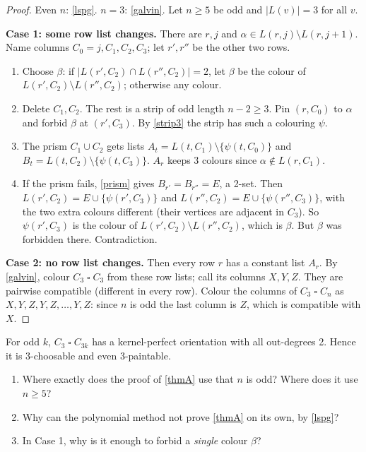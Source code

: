 \documentclass[11pt,oneside,openany]{book}
\newcounter{res}[chapter]
\renewcommand{\theres}{\thechapter.\arabic{res}}
\newenvironment{resultbox}[3]{\refstepcounter{res}\begin{tcolorbox}[breakable,colback=#1!5,colframe=#1,
  fonttitle=\bfseries,title={#2 \theres\ifx&#3&\else\ (#3)\fi}]}{\end{tcolorbox}}
\newenvironment{cited}[1][]{\begin{resultbox}{citc}{Known result}{#1}}{\end{resultbox}}
\newenvironment{ponder}{\begin{tcolorbox}[breakable,colback=yellow!7,colframe=orange!70!black,fonttitle=\bfseries,title={Think it over}]\begin{enumerate}[label=\textbf{Q\arabic*.},leftmargin=2.4em,itemsep=0.25em]}{\end{enumerate}\end{tcolorbox}}
\newenvironment{steps}[1][]{\begin{enumerate}[label=\textbf{Step \arabic*.},leftmargin=4.2em,itemsep=0.3em,#1]}{\end{enumerate}}
\newcommand{\T}{\mathbin{\square}}
\begin{document}
\begin{proof}
Even $n$: \ref{lspg}. $n = 3$: \ref{galvin}. Let $n \ge 5$ be odd and $|L(v)| = 3$ for all $v$.

\textbf{Case 1: some row list changes.} There are $r, j$ and $\alpha \in L(r, j) \setminus L(r, j+1)$. Name
columns $C_0 = j, C_1, C_2, C_3$; let $r', r''$ be the other two rows.
\begin{steps}
\item Choose $\beta$: if $|L(r', C_2) \cap L(r'', C_2)| = 2$, let $\beta$ be the colour of
$L(r', C_2) \setminus L(r'', C_2)$; otherwise any colour.
\item Delete $C_1, C_2$. The rest is a strip of odd length $n - 2 \ge 3$. Pin $(r, C_0)$ to $\alpha$ and forbid
$\beta$ at $(r', C_3)$. By \ref{strip3} the strip has such a colouring $\psi$.
\item The prism $C_1 \cup C_2$ gets lists $A_t = L(t, C_1) \setminus \{\psi(t, C_0)\}$ and
$B_t = L(t, C_2) \setminus \{\psi(t, C_3)\}$. $A_r$ keeps 3 colours since $\alpha \notin L(r, C_1)$.
\item If the prism fails, \ref{prism} gives $B_{r'} = B_{r''} = E$, a 2-set. Then $L(r', C_2) = E \cup
\{\psi(r', C_3)\}$ and $L(r'', C_2) = E \cup \{\psi(r'', C_3)\}$, with the two extra colours different (their
vertices are adjacent in $C_3$). So $\psi(r', C_3)$ is the colour of $L(r', C_2) \setminus L(r'', C_2)$, which is
$\beta$. But $\beta$ was forbidden there. Contradiction.
\end{steps}

\textbf{Case 2: no row list changes.} Then every row $r$ has a constant list $A_r$. By \ref{galvin}, colour
$C_3 \T C_3$ from these row lists; call its columns $X, Y, Z$. They are pairwise compatible (different in
every row). Colour the columns of $C_3 \T C_n$ as $X, Y, Z, Y, Z, \dots, Y, Z$: since $n$ is odd the last
column is $Z$, which is compatible with $X$.
\end{proof}

\begin{cited}[Amrutanshu, kernel method; checked by us]\label{kernel}
For odd $k$, $C_3 \T C_{3k}$ has a kernel-perfect orientation with all out-degrees 2. Hence it is
3-choosable and even 3-paintable.
\end{cited}

\begin{ponder}
\item Where exactly does the proof of \ref{thmA} use that $n$ is odd? Where does it use $n \ge 5$?
\item Why can the polynomial method not prove \ref{thmA} on its own, by \ref{lspg}?
\item In Case 1, why is it enough to forbid a \emph{single} colour $\beta$?
\end{ponder}
\end{document}
